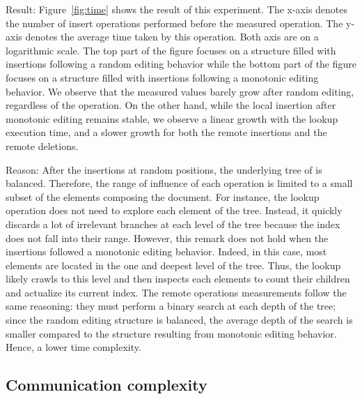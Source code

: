 \begin{asparadesc}
\item [Result:] Figure~\ref{fig:time} shows the result of this experiment. The
  x-axis denotes the number of insert operations performed before the measured
  operation. The y-axis denotes the average time taken by this operation. Both
  axis are on a logarithmic scale. The top part of the figure focuses on a
  structure filled with insertions following a random editing behavior while the
  bottom part of the figure focuses on a structure filled with insertions
  following a monotonic editing behavior. We observe that the measured values
  barely grow after random editing, regardless of the operation. On the other
  hand, while the local insertion after monotonic editing remains stable, we
  observe a linear growth with the lookup execution time, and a slower growth
  for both the remote insertions and the remote deletions.
\item [Reason:] After the insertions at random positions, the underlying tree of
  \LSEQ is balanced. Therefore, the range of influence of each operation is
  limited to a small subset of the elements composing the document. For
  instance, the lookup operation does not need to explore each element of the
  tree. Instead, it quickly discards a lot of irrelevant branches at each level
  of the tree because the index does not fall into their range. However, this
  remark does not hold when the insertions followed a monotonic editing
  behavior. Indeed, in this case, most elements are located in the one and
  deepest level of the tree. Thus, the lookup likely crawls to this level and
  then inspects each elements to count their children and actualize its current
  index. The remote operations measurements follow the same reasoning: they must
  perform a binary search at each depth of the tree; since the random editing
  structure is balanced, the average depth of the search is smaller compared to
  the structure resulting from monotonic editing behavior. Hence, a lower time
  complexity.
\end{asparadesc}

\subsection{Communication complexity}

